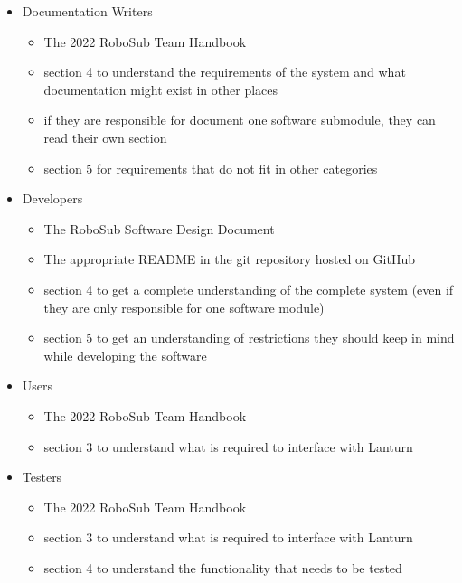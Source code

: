\begin{itemize}
    \item Documentation Writers 
        \begin{itemize}
            \item The 2022 RoboSub Team Handbook 
            \item section 4 to understand the requirements of the system and what documentation might exist in other places 
            \item if they are responsible for document one software submodule, they can read their own section 
            \item section 5 for requirements that do not fit in other categories
        \end{itemize}

    \item Developers 
        \begin{itemize}
            \item The RoboSub Software Design Document 
            \item The appropriate README in the git repository hosted on GitHub 
            \item section 4 to get a complete understanding of the complete system (even if they are only responsible for one software module) 
            \item section 5 to get an understanding of restrictions they should keep in mind while developing the software
        \end{itemize}

    \item Users 
        \begin{itemize}
            \item The 2022 RoboSub Team Handbook 
            \item section 3 to understand what is required to interface with Lanturn 
        \end{itemize}

    \item Testers 
        \begin{itemize}
            \item The 2022 RoboSub Team Handbook 
            \item section 3 to understand what is required to interface with Lanturn
            \item section 4 to understand the functionality that needs to be tested
        \end{itemize}
\end{itemize}

